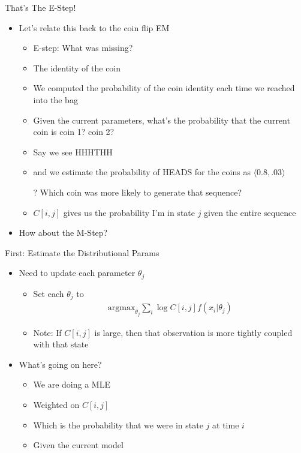 \documentclass[aspectratio=169]{beamer}
\begin{document}
\begin{frame}{That's The E-Step!}

\begin{itemize}
\item Let's relate this back to the coin flip EM
\begin{itemize}
\item E-step: What was missing? 
\item The identity of the coin
\item We computed the probability of the coin identity each time we reached into the bag
\item Given the current parameters, what's the probability that the current coin is coin 1? coin 2?
\item Say we see HHHTHH
\item and we estimate the probability of HEADS for the coins as $\langle 0.8, .03 \rangle$
\item[?] Which coin was more likely to generate that sequence?
\vspace {1em} 
\item $C[i,j]$ gives us the probability I'm in state $j$ given the entire sequence
\end{itemize}
\item How about the M-Step?
\end{itemize}
\end{frame}

\begin{frame}{First: Estimate the Distributional Params}

\begin{itemize}
\item Need to update each parameter $\theta_j$
	\begin{itemize}
	\item Set each $\theta_j$ to 
	\begin{align}
		\textrm{argmax}_{\theta_j} \sum_i \log C[i,j] f(x_i | \theta_j) \nonumber
	\end{align}
	\item Note: If $C[i,j]$ is large, then that observation is more tightly coupled with that state
	\end{itemize}
\item What's going on here?
	\begin{itemize}
	\item We are doing a MLE
	\item Weighted on $C[i,j]$
	\item Which is the probability that we were in state $j$ at time $i$
	\item Given the current model
	\end{itemize}
\end{itemize}
\end{frame}
\end{document}

